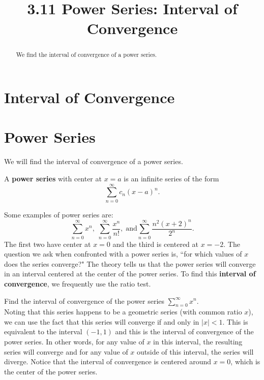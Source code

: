 \documentclass[handout]{ximera}
\title{3.11 Power Series: Interval of Convergence}
\begin{document}
\begin{abstract}
We find the interval of convergence of a power series.
\end{abstract}

\maketitle

\section{Interval of Convergence}

\section{Power Series}

We will find the interval of convergence of a power series.

\begin{definition}
A \textbf{power series} with center at $x = a$ is an infinite series of the form
\[
\sum_{n=0}^\infty c_n(x-a)^n.
\]
\end{definition}

Some examples of power series are:
\[ 
\sum_{n=0}^\infty x^n, \; \sum_{n=0}^\infty \frac{x^n}{n!}, \;\text{and} \sum_{n=0}^\infty \frac{n^2(x+ 2)^n}{2^n}.
\]
The first two have center at $x = 0$ and the third is centered at $x = -2$. 
The question we ask when confronted with a power series is, ``for which values of $x$ does the series converge?"
The theory tells us that the power series will converge in an interval centered at the center of the power series.
To find this \textbf{interval of convergence}, we frequently use the ratio test.

\begin{example}[example 1]
Find the interval of convergence of the power series $\displaystyle{\sum_{n=0}^\infty x^n}$.\\
Noting that this series happens to be a geometric series (with common ratio $x$), we can use the fact that this series will converge 
if and only in $|x| < 1$.  This is equivalent to the interval $(-1, 1)$ and this is the interval of convergence of the power series.
In other words, for any value of $x$ in this interval, 
the resulting series will converge and for any value of $x$ outside of this interval, 
the series will diverge. Notice that the interval of convergence is centered around $x = 0$, which is the center of the power series.
\end{example}
\end{document}

